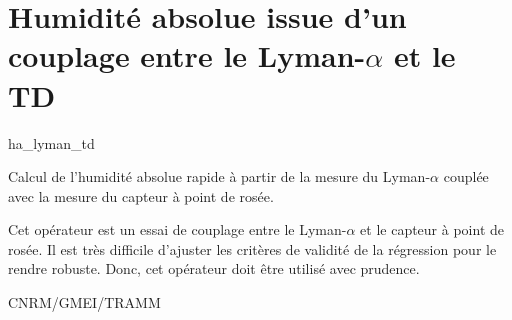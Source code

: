 %
\section{Humidit\'e absolue issue d'un couplage entre le Lyman-$\alpha$ 
et le TD}

 {\sf ha\_lyman\_td}

Calcul de l'humidit\'e absolue rapide \`a partir de la 
mesure du  Lyman-$\alpha$ coupl\'ee avec la mesure du capteur
\`a point de ros\'ee.

\bigskip






Cet op\'erateur est un essai de couplage entre 
le Lyman-$\alpha$ et le capteur \`a point de
ros\'ee. Il est tr\`es 
difficile d'ajuster les crit\`eres de 
validit\'e de la r\'egression pour le rendre
robuste.
Donc, cet op\'erateur doit \^etre utilis\'e
avec prudence.

CNRM/GMEI/TRAMM

